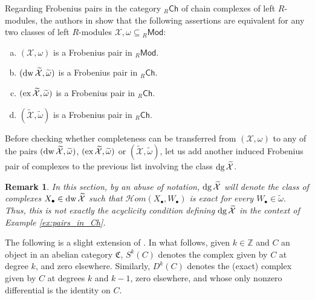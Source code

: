 \documentclass[10pt,reqno]{amsart}
\numberwithin{equation}{section}
\newtheorem{remark}[definition]{Remark}
\theoremstyle{remark}
\newcommand{\X}{\mathcal{X}}
\begin{document}
Regarding Frobenius pairs in the category ${}_R\mathsf{Ch}$ of chain complexes of left $R$-modules, the authors in \cite[Thm. 3.3]{LiangYangConstructions} show that the following assertions are equivalent for any two classes of left $R$-modules $\X, \omega \subseteq {}_R\mathsf{Mod}$:
\begin{enumerate}[(a)]
\item $(\X,\omega)$ is a Frobenius pair in ${}_R\mathsf{Mod}$. 

\item $({\rm dw}\,\widetilde{\X},\widetilde{\omega})$ is a Frobenius pair in ${}_R\mathsf{Ch}$. 

\item $({\rm ex}\,\widetilde{\X},\widetilde{\omega})$ is a Frobenius pair in ${}_R\mathsf{Ch}$.

\item $(\widetilde{\X},\widetilde{\omega})$ is a Frobenius pair in ${}_R\mathsf{Ch}$.
\end{enumerate}

Before checking whether completeness can be transferred from $(\X,\omega)$ to any of the pairs $({\rm dw}\,\widetilde{\X},\widetilde{\omega})$, $({\rm ex}\,\widetilde{\X},\widetilde{\omega})$ or $(\widetilde{\X},\widetilde{\omega})$, let us add another induced Frobenius pair of complexes to the previous list involving the class ${\rm dg}\,\widetilde{\mathcal{X}}$.

\begin{remark}
In this section, by an abuse of notation, ${\rm dg}\,\widetilde{\mathcal{X}}$ will denote the class of complexes $X_\bullet \in {\rm dw}\,\widetilde{\mathcal{X}}$ such that $\mathcal{H}om(X_\bullet, W_\bullet)$ is exact for every $W_\bullet \in \widetilde{\omega}$. Thus, this is not exactly the acyclicity condition defining ${\rm dg}\,\widetilde{\mathcal{X}}$ in the context of Example \ref{ex:pairs_in_Ch}.
\end{remark}

The following is a slight extension of \cite[Lem. 3.1]{GillespieFlat}. In what follows, given $k \in \mathbb{Z}$ and $C$ an object in an abelian category $\mathfrak{C}$, $S^k(C)$ denotes the complex given by $C$ at degree $k$, and zero elsewhere. Similarly, $D^k(C)$ denotes the (exact) complex given by $C$ at degrees $k$ and $k-1$, zero elsewhere, and whose only nonzero differential is the identity on $C$.
\end{document}
